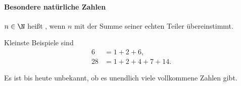 \paragraph{Besondere natürliche Zahlen}

\begin{df}
	$n \in \N$ heißt , wenn $n$ mit der Summe seiner echten Teiler übereinstimmt.
\end{df}

\begin{ex}
	Kleinste Beispiele sind
	\begin{align*}
		6 &= 1 + 2 + 6, \\
		28 &= 1 + 2 + 4 + 7 + 14.
	\end{align*}
\end{ex}

Es ist bis heute unbekannt, ob es unendlich viele vollkommene Zahlen gibt.







